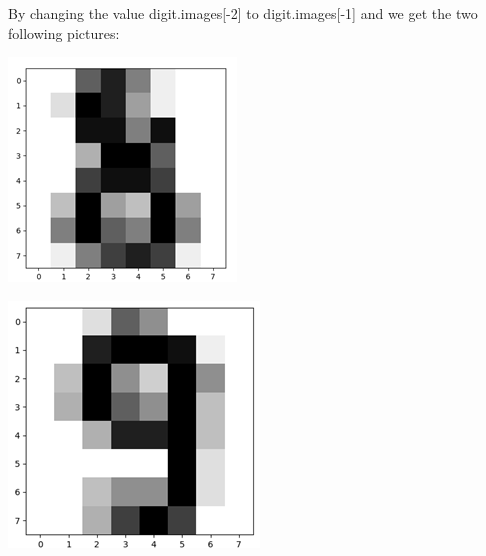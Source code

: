 \documentclass[a4paper,12pt]{report}
\begin{document}

By changing the value digit.images[-2] to digit.images[-1] and we get the two following pictures:

\begin{center}
\captionsetup{type=figure}
\begin{minipage}[c]{.45\linewidth}
    \centering
    \includegraphics[width=1\linewidth]{media/digit8.png}
\end{minipage}
\begin{minipage}[c]{.45\linewidth}
    \centering
    \includegraphics[width=1\linewidth]{media/digit9.png}
\end{minipage}
\end{center}
\end{document}
